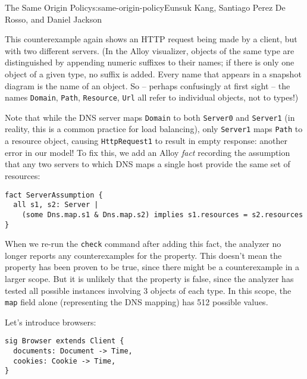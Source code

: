 \begin{aosachapter}{The Same Origin Policy}{s:same-origin-policy}{Eunsuk Kang, Santiago Perez De Rosso, and Daniel Jackson}


This counterexample again shows an HTTP request being made by a client,
but with two different servers. (In the Alloy visualizer, objects of the
same type are distinguished by appending numeric suffixes to their
names; if there is only one object of a given type, no suffix is added.
Every name that appears in a snapshot diagram is the name of an object.
So -- perhaps confusingly at first sight -- the names \texttt{Domain},
\texttt{Path}, \texttt{Resource}, \texttt{Url} all refer to individual
objects, not to types!)

Note that while the DNS server maps \texttt{Domain} to both
\texttt{Server0} and \texttt{Server1} (in reality, this is a common
practice for load balancing), only \texttt{Server1} maps \texttt{Path}
to a resource object, causing \texttt{HttpRequest1} to result in empty
response: another error in our model! To fix this, we add an Alloy
\emph{fact} recording the assumption that any two servers to which DNS
maps a single host provide the same set of resources:

\begin{verbatim}
fact ServerAssumption {
  all s1, s2: Server | 
    (some Dns.map.s1 & Dns.map.s2) implies s1.resources = s2.resources
}
\end{verbatim}

When we re-run the \texttt{check} command after adding this fact, the
analyzer no longer reports any counterexamples for the property. This
doesn't mean the property has been proven to be true, since there might
be a counterexample in a larger scope. But it is unlikely that the
property is false, since the analyzer has tested all possible instances
involving 3 objects of each type. In this scope, the \texttt{map} field
alone (representing the DNS mapping) has 512 possible values.

\label{browser}

Let's introduce browsers:

\begin{verbatim}
sig Browser extends Client {
  documents: Document -> Time,
  cookies: Cookie -> Time,
}
\end{verbatim}


\end{aosachapter}
